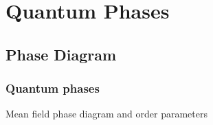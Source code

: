 \documentclass[]{beamer}
\begin{document}
\section{Quantum Phases}

\subsection{Phase Diagram}
\begin{frame}\frametitle{Quantum phases}
\pause
\begin{block}{Mean field phase diagram and order parameters}
\begin{figure}
    \centering
\pause
\pause
\end{figure}
\end{block}
\end{frame}
\end{document}
